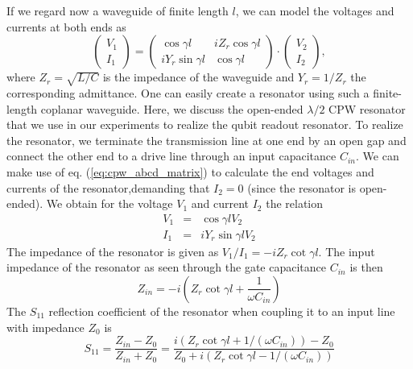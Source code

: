 If we regard now a waveguide of finite length $l$, we can model the voltages and currents at both ends as \citep{pozar_microwave_2011}
%
\begin{equation}
\left( \begin{array}{c} V_1 \\ I_1 \end{array}\right) = \left( 
		\begin{array}{cc}
			\cos{\gamma l} & iZ_r \cos{\gamma l} \\
			i Y_r \sin{\gamma l} & \cos{\gamma l}
		\end{array}
		\right) \cdot \left(
		\begin{array}{c}
			V_2 \\ I_2
		\end{array}
		\right), \label{eq:cpw_abcd_matrix}
\end{equation}
%
where $Z_r=\sqrt{L/C}$ is the impedance of the waveguide and $Y_r=1/Z_r$ the corresponding admittance. One can easily create a resonator using such a finite-length coplanar waveguide. Here, we discuss the open-ended $\lambda / 2$ CPW resonator that we use in our experiments to realize the qubit readout resonator. To realize the resonator, we terminate the transmission line at one end by an open gap and connect the other end to a drive line through an input capacitance $C_{in}$. We can make use of eq. (\ref{eq:cpw_abcd_matrix}) to calculate the end voltages and currents of the resonator,demanding that $I_2=0$ (since the resonator is open-ended). We obtain for the voltage $V_1$ and current $I_2$ the relation
%
\begin{eqnarray}
V_1 & = & \cos{\gamma l} V_2 \\
I_1 & = & i Y_r \sin{\gamma l} V_2
\end{eqnarray}
%
The impedance of the resonator is given as $V_1/I_1 = -i Z_r \cot{\gamma l}$. The input impedance of the resonator as seen through the gate capacitance $C_{in}$ is then
%
\begin{equation}
Z_{in} = -i \left(Z_r \cot{\gamma l}+\frac{1}{\omega C_{in}}\right) \label{eq:cpw_impedance}
\end{equation}
%
The $S_{11}$ reflection coefficient of the resonator when coupling it to an input line with impedance $Z_0$ is
%
\begin{equation}
S_{11} = \frac{Z_{in}-Z_0}{Z_{in}+Z_0} = \frac{i(Z_r\cot{\gamma l}+1/(\omega C_{in}))-Z_0}{Z_0+i(Z_r\cot{\gamma l}-1/(\omega C_{in}))}
\end{equation}
%
